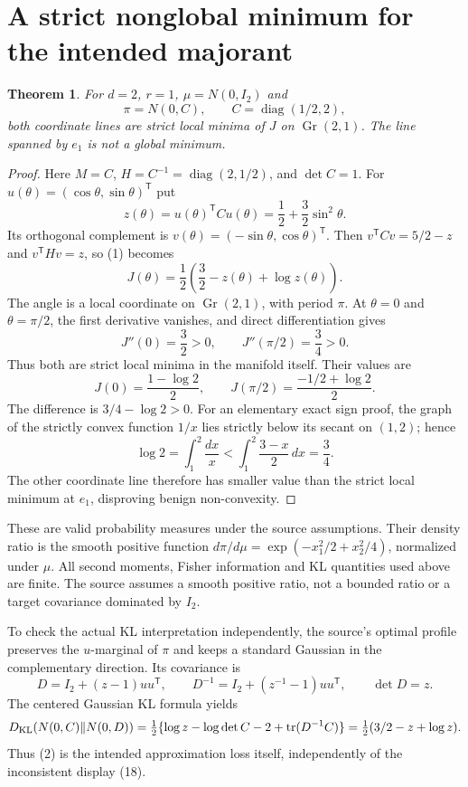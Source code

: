 \documentclass[11pt]{article}
\newtheorem{theorem}{Theorem}
\newcommand{\Gr}{\operatorname{Gr}}
\newcommand{\tr}{\operatorname{tr}}
\newcommand{\diag}{\operatorname{diag}}
\begin{document}
\section*{A strict nonglobal minimum for the intended majorant}
\begin{theorem}
For $d=2$, $r=1$, $\mu=N(0,I_2)$ and
\[
 \pi=N(0,C),\qquad C=\diag(1/2,2),
\]
both coordinate lines are strict local minima of $J$ on $\Gr(2,1)$.
The line spanned by $e_1$ is not a global minimum.
\end{theorem}
\begin{proof}
Here $M=C$, $H=C^{-1}=\diag(2,1/2)$, and $\det C=1$.
For $u(\theta)=(\cos\theta,\sin\theta)^{\mathsf T}$ put
\[
 z(\theta)=u(\theta)^{\mathsf T}Cu(\theta)
 =\frac12+\frac32\sin^2\theta.
\]
Its orthogonal complement is $v(\theta)=(-\sin\theta,\cos\theta)^{\mathsf T}$.
Then $v^{\mathsf T}Cv=5/2-z$ and $v^{\mathsf T}Hv=z$, so (1) becomes
\[
 J(\theta)=\frac12\left(\frac32-z(\theta)+\log z(\theta)\right). \tag{2}
\]
The angle is a local coordinate on $\Gr(2,1)$, with period $\pi$.
At $\theta=0$ and $\theta=\pi/2$, the first derivative vanishes, and
direct differentiation gives
\[
 J''(0)=\frac32>0,\qquad J''(\pi/2)=\frac34>0.
\]
Thus both are strict local minima in the manifold itself. Their values are
\[
 J(0)=\frac{1-\log2}{2},\qquad
 J(\pi/2)=\frac{-1/2+\log2}{2}.
\]
The difference is $3/4-\log2>0$. For an elementary exact sign proof,
the graph of the strictly convex function $1/x$ lies strictly below its
secant on $(1,2)$; hence
\[
 \log2=\int_1^2\frac{dx}{x}
 <\int_1^2\frac{3-x}{2}\,dx=\frac34.
\]
The other coordinate line therefore has smaller value than the strict
local minimum at $e_1$, disproving benign non-convexity.
\end{proof}

These are valid probability measures under the source assumptions.
Their density ratio is the smooth positive function
$d\pi/d\mu=\exp(-x_1^2/2+x_2^2/4)$, normalized under $\mu$.
All second moments, Fisher information and KL quantities used above are finite.
The source assumes a smooth positive ratio, not a bounded ratio or a
target covariance dominated by $I_2$.

To check the actual KL interpretation independently, the source's optimal
profile preserves the $u$-marginal of $\pi$ and keeps a standard Gaussian
in the complementary direction. Its covariance is
\[
 D=I_2+(z-1)uu^{\mathsf T},\qquad
 D^{-1}=I_2+(z^{-1}-1)uu^{\mathsf T},\qquad \det D=z.
\]
The centered Gaussian KL formula yields
\[
 D_{\rm KL}(N(0,C)\Vert N(0,D))
 =\tfrac12\{\log z-\log\det C-2+\tr(D^{-1}C)\}
 =\tfrac12(3/2-z+\log z).
\]
Thus (2) is the intended approximation loss itself, independently of
the inconsistent display (18).
\end{document}
